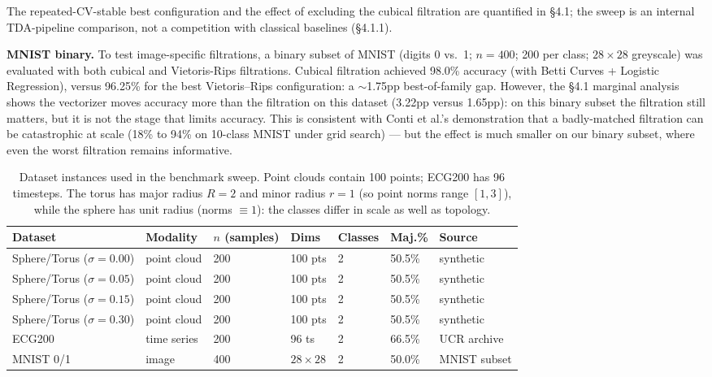 \documentclass[12pt, a4paper]{report}
\theoremstyle{definition}
\theoremstyle{plain}
\theoremstyle{remark}
\begin{document}
The repeated-CV-stable best configuration and the effect of excluding
the cubical filtration are quantified in \S4.1; the sweep is an
internal TDA-pipeline comparison, not a competition with classical
baselines (\S4.1.1).

\noindent\textbf{MNIST binary.} To test image-specific filtrations,
a binary subset of MNIST (digits 0 vs.\ 1; $n=400$; 200 per class;
$28 \times 28$ greyscale) was evaluated with both cubical and
Vietoris-Rips filtrations. Cubical filtration achieved 98.0\%
accuracy (with Betti Curves + Logistic Regression), versus 96.25\%
for the best Vietoris--Rips configuration: a $\sim$1.75pp best-of-family gap.
However, the \S4.1 marginal analysis shows the vectorizer
moves accuracy more than the filtration on this dataset (3.22pp
versus 1.65pp): on this binary subset the filtration still matters,
but it is not the stage that limits accuracy. This is consistent with
Conti et al.'s demonstration that a badly-matched filtration can be
catastrophic at scale (18\% to 94\% on 10-class MNIST under grid
search) --- but the effect is much smaller on our binary subset,
where even the worst filtration remains informative.

\begin{table}[H]
  \centering
  \caption{Dataset instances used in the benchmark sweep. Point clouds
  contain 100 points; ECG200 has 96 timesteps. The torus has major
  radius $R=2$ and minor radius $r=1$ (so point norms range
  $[1,3]$), while the sphere has unit radius (norms $\equiv 1$):
  the classes differ in scale as well as topology.}
  \label{tab:datasets}
  \footnotesize
  \begin{tabularx}{\textwidth}{lXXXXl@{\hspace{4pt}}l}
    \toprule
    Dataset & Modality & $n$ (samples) & Dims & Classes & Maj.\% & Source \\
    \midrule
    Sphere/Torus ($\sigma{=}0.00$) & point cloud & 200 & 100 pts & 2 & 50.5\% & synthetic \\
    Sphere/Torus ($\sigma{=}0.05$) & point cloud & 200 & 100 pts & 2 & 50.5\% & synthetic \\
    Sphere/Torus ($\sigma{=}0.15$) & point cloud & 200 & 100 pts & 2 & 50.5\% & synthetic \\
    Sphere/Torus ($\sigma{=}0.30$) & point cloud & 200 & 100 pts & 2 & 50.5\% & synthetic \\
    ECG200 & time series & 200 & 96 ts & 2 & 66.5\% & UCR archive \cite{dau2019} \\
    MNIST 0/1 & image & 400 & $28\times28$ & 2 & 50.0\% & MNIST subset \\
    \bottomrule
  \end{tabularx}
\end{table}
\end{document}
